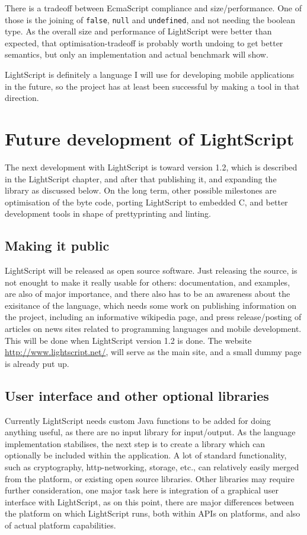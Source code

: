 \documentclass[11pt]{report}
\begin{document}
There is a tradeoff between EcmaScript compliance and size/performance. 
One of those is the joining of \verb|false|, \verb|null| and \verb|undefined|, and not needing the boolean type.
As the overall size and performance of LightScript were better than expected,
that optimisation-tradeoff is probably worth undoing to get better semantics, 
but only an implementation and actual benchmark will show. 

LightScript is definitely a language I will use for developing mobile applications in the future, so the project has at least been successful by making a tool in that direction.

\section{Future development of LightScript}

The next development with LightScript is toward version 1.2, which is described in the LightScript chapter, and after that publishing it, and expanding the library as discussed below.
On the long term, other possible milestones are optimisation of the byte code, porting LightScript to embedded C, and better development tools in shape of prettyprinting and linting.

\subsection{Making it public}
LightScript will be released as open source software. 
Just releasing the source, is not enought to make it really usable for others: documentation, and examples, are also of major importance, and there also has to be an awareness about the exisitance of the language, which needs some work on publishing information on the project, including an informative wikipedia page, and press release/posting of articles on news sites related to programming languages and mobile development.
This will be done when LightScript version 1.2 is done.
The website \url{http://www.lightscript.net/}, will serve as the main site, and a small dummy page is already put up.

\subsection{User interface and other optional libraries}

Currently LightScript needs custom Java functions to be added for doing anything useful, as there are no input library for input/output.
As the language implementation stabilises, the next step is to create a library which can optionally be included within the application.
A lot of standard functionality, such as cryptography, http-networking, storage, etc.,  can relatively easily merged from the platform, or existing open source libraries. 
Other libraries may require further consideration, one major task here is integration of a graphical user interface with LightScript, as on this point, there are major differences between the platform on which LightScript runs, both within APIs on platforms, and also of actual platform capabilities.
\end{document}
